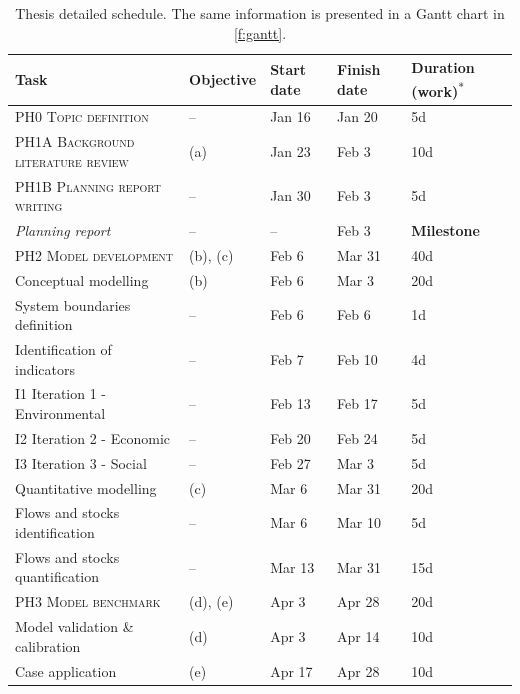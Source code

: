 \documentclass[a4paper,fontsize=11pt,bibliography=totoc]{scrartcl}
\begin{document}
\begin{table}[h!]
\centering
\footnotesize
\caption{Thesis detailed schedule. The same information is presented in a Gantt chart in \autoref{f:gantt}.}
\label{t:schedule}
\begin{tabular}{lllll}
\toprule
Task & Objective & Start date & Finish date & Duration (work)\textsuperscript{$\ast$} \\
\midrule
\textsc{PH0 Topic definition} & -- & Jan 16 & Jan 20 & 5d \\[0.5em]
\textsc{PH1A Background literature review} & (a) & Jan 23 & Feb 3 & 10d \\
\textsc{PH1B Planning report writing} & -- & Jan 30 & Feb 3 & 5d \\
\textit{Planning report} & -- & -- & Feb 3 & \textbf{Milestone} \\[0.5em]
\textsc{PH2 Model development} & (b), (c) & Feb 6 & Mar 31 & 40d \\
\hspace{1em}Conceptual modelling & (b) & Feb 6 & Mar 3 & 20d \\
\hspace{2em}System boundaries definition & -- & Feb 6 & Feb 6 & 1d \\
\hspace{2em}Identification of indicators & -- & Feb 7 & Feb 10 & 4d \\
\hspace{2em}I1 Iteration 1 - Environmental & -- & Feb 13 & Feb 17 & 5d \\
\hspace{2em}I2 Iteration 2 - Economic & -- & Feb 20 & Feb 24 & 5d \\
\hspace{2em}I3 Iteration 3 - Social & -- & Feb 27 & Mar 3 & 5d \\
\hspace{1em}Quantitative modelling & (c) & Mar 6 & Mar 31 & 20d \\
\hspace{2em}Flows and stocks identification & -- & Mar 6 & Mar 10 & 5d \\
\hspace{2em}Flows and stocks quantification & -- & Mar 13 & Mar 31 & 15d \\[0.5em]
\textsc{PH3 Model benchmark} & (d), (e) & Apr 3 & Apr 28 & 20d \\
\hspace{1em}Model validation \& calibration & (d) & Apr 3 & Apr 14 & 10d \\
\hspace{1em}Case application & (e) & Apr 17 & Apr 28 & 10d \\[0.5em]

\end{tabular}
\end{table}
\end{document}
